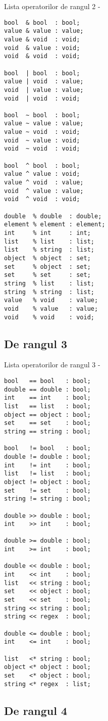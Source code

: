 \noindent Lista operatorilor de rangul 2 -
\begin{verbatim}
bool  & bool  : bool;
value & value : value;
value & void  : void;
void  & value : void;
void  & void  : void;

bool  | bool  : bool;
value | void  : value;
void  | value : value;
void  | void  : void;

bool  ~ bool  : bool;
value ~ value : value;
value ~ void  : void;
void  ~ value : void;
void  ~ void  : void;

bool  ^ bool  : bool;
value ^ value : void;
value ^ void  : value;
void  ^ value : value;
void  ^ void  : void;

double  % double  : double;
element % element : element;
int     % int     : int;
list    % list    : list;
list    % string  : list;
object  % object  : set;
set     % object  : set;
set     % set     : set;
string  % list    : list;
string  % string  : list;
value   % void    : value;
void    % value   : value;
void    % void    : void;
\end{verbatim}

\subsection{De rangul 3}

\noindent Lista operatorilor de rangul 3 -
\begin{verbatim}
bool   == bool   : bool;
double == double : bool;
int    == int    : bool;
list   == list   : bool;
object == object : bool;
set    == set    : bool;
string == string : bool;

bool   != bool   : bool;
double != double : bool;
int    != int    : bool;
list   != list   : bool;
object != object : bool;
set    != set    : bool;
string != string : bool;

double >> double : bool;
int    >> int    : bool;

double >= double : bool;
int    >= int    : bool;

double << double : bool;
int    << int    : bool;
list   << string : bool;
set    << object : bool;
set    << set    : bool;
string << string : bool;
string << regex  : bool;

double <= double : bool;
int    <= int    : bool;

list   <* string : bool;
object <* object : bool;
set    <* object : bool;
string <* regex  : list;
\end{verbatim}

\subsection{De rangul 4}

